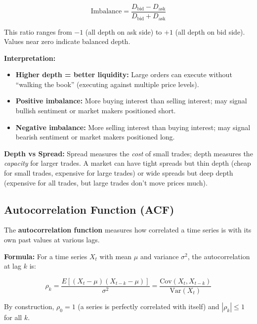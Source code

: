 \begin{equation}
\text{Imbalance} = \frac{D_{\text{bid}} - D_{\text{ask}}}{D_{\text{bid}} + D_{\text{ask}}}
\end{equation}

This ratio ranges from $-1$ (all depth on ask side) to $+1$ (all depth on bid side). Values near zero indicate balanced depth.

\textbf{Interpretation:}
\begin{itemize}
    \item \textbf{Higher depth = better liquidity:} Large orders can execute without ``walking the book'' (executing against multiple price levels).
    \item \textbf{Positive imbalance:} More buying interest than selling interest; may signal bullish sentiment or market makers positioned short.
    \item \textbf{Negative imbalance:} More selling interest than buying interest; may signal bearish sentiment or market makers positioned long.
\end{itemize}

\textbf{Depth vs Spread:} Spread measures the \textit{cost} of small trades; depth measures the \textit{capacity} for larger trades. A market can have tight spreads but thin depth (cheap for small trades, expensive for large trades) or wide spreads but deep depth (expensive for all trades, but large trades don't move prices much).

\subsection{Autocorrelation Function (ACF)}
\label{method:acf-appendix}

The \textbf{autocorrelation function} measures how correlated a time series is with its own past values at various lags.

\textbf{Formula:} For a time series $X_t$ with mean $\mu$ and variance $\sigma^2$, the autocorrelation at lag $k$ is:

\begin{equation}
\rho_k = \frac{E[(X_t - \mu)(X_{t-k} - \mu)]}{\sigma^2} = \frac{\text{Cov}(X_t, X_{t-k})}{\text{Var}(X_t)}
\end{equation}

By construction, $\rho_0 = 1$ (a series is perfectly correlated with itself) and $|\rho_k| \leq 1$ for all $k$.

